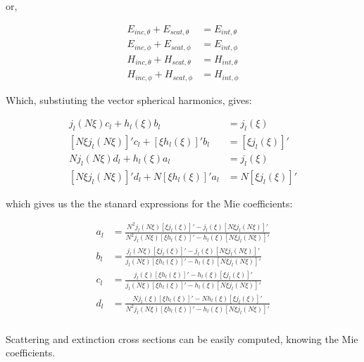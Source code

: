             or,

            \begin{align}
                E_{inc,\theta} + E_{scat,\theta} &= E_{int, \theta} \\
                E_{inc,\phi} + E_{scat,\phi} &= E_{int, \phi} \\
                H_{inc,\theta} + H_{scat,\theta} &= H_{int, \theta} \\
                H_{inc,\phi} + H_{scat,\phi} &= H_{int, \phi}
            \end{align}

            Which, substiuting the vector spherical harmonics, gives:

            \begin{align}
                j_l(N\xi)c_l + h_l(\xi)b_l&=j_l(\xi)\\
                [N\xi j_l(N\xi)]'c_l+ [\xi h_l(\xi)]'b_l&= [\xi j_l(\xi)]'\\
                Nj_l(N\xi)d_l + h_l(\xi)a_l &= j_l(\xi)\\
                [N\xi j_l(N\xi)]'d_l +N[\xi h_l(\xi)]'a_l &= N[\xi j_l(\xi)]'
            \end{align}

            which gives us the the stanard expressions for the Mie coefficients:

            \begin{align}
                a_l &= \frac{N^2 j_l(N\xi)[\xi j_l(\xi)]' - j_l(\xi)[N\xi j_l(N \xi)]'}{N^2 j_l(N\xi)[\xi h_l(\xi)]' - h_l(\xi)[N\xi j_l(N \xi)]'}\\
                b_l &= \frac{j_l(N\xi)[\xi j_l(\xi)]' - j_l(\xi)[N\xi j_l(N\xi)]'}{j_l(N\xi)[\xi h_l(\xi)]' - h_l(\xi)[N\xi j_l(N\xi)]'}\\
                c_l &= \frac{j_l(\xi)[\xi h_l(\xi)]' - h_l(\xi)[\xi j_l(\xi)]'}{j_l(N\xi)[\xi h_l(\xi)]' - h_l(\xi)[N\xi j_l(N\xi)]'}\\
                d_l &= \frac{Nj_l(\xi)[\xi h_l(\xi)]' - N h_l(\xi)[\xi j_l(\xi)]'}{N^2 j_l(N\xi)[\xi h_l(\xi)]' - h_l(\xi)[N\xi j_l(N\xi)]'}
            \end{align}

        \subsubsection{}
            Scattering and extinction cross sections can be easily computed, knowing the Mie coefficients.


